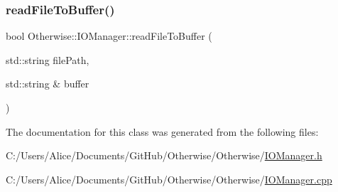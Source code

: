 \subsubsection{\texorpdfstring{read\+File\+To\+Buffer()}{readFileToBuffer()}\hspace{0.1cm}{\footnotesize\ttfamily [2/2]}}
{\footnotesize\ttfamily bool Otherwise\+::\+I\+O\+Manager\+::read\+File\+To\+Buffer (\begin{DoxyParamCaption}\item[{std\+::string}]{file\+Path,  }\item[{std\+::string \&}]{buffer }\end{DoxyParamCaption})\hspace{0.3cm}{\ttfamily [static]}}



The documentation for this class was generated from the following files\+:\begin{DoxyCompactItemize}
\item 
C\+:/\+Users/\+Alice/\+Documents/\+Git\+Hub/\+Otherwise/\+Otherwise/\hyperlink{_i_o_manager_8h}{I\+O\+Manager.\+h}\item 
C\+:/\+Users/\+Alice/\+Documents/\+Git\+Hub/\+Otherwise/\+Otherwise/\hyperlink{_i_o_manager_8cpp}{I\+O\+Manager.\+cpp}\end{DoxyCompactItemize}

